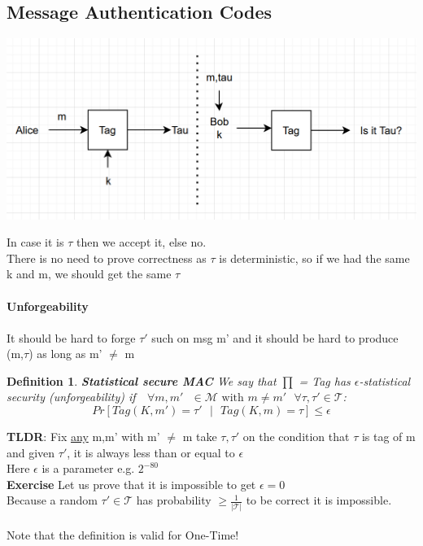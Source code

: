 \documentclass[11pt, a4paper]{article}
\newtheorem{defn}{Definition}
\begin{document}
\subsection{Message Authentication Codes}
\begin{center}
    \includegraphics[scale=0.5]{img/MAC.png}
\end{center}
In case it is $\tau$ then we accept it, else no.\\
There is no need to prove correctness as $\tau$ is deterministic, so if we had the same k and m, we should get the same $\tau$\\\\
\textbf{Unforgeability}\\\\
It should be hard to forge $\tau'$ such on msg m' and it should be hard to produce (m,$\tau$) as long as m' $\neq$ m\\
\begin{defn}
\textbf{Statistical secure MAC} We say that $\prod$ = Tag has $\epsilon$-statistical security (unforgeability) if  $\text{ }\forall m,m'\text{ } \in \mathcal{M} \text{ with } m \neq m'\text{ } \forall \tau,\tau' \in \mathcal{T}$:\\
$$Pr[Tag(K,m') = \tau'\text{ } | \text{ }Tag(K,m)= \tau] \leq \epsilon$$
\end{defn}
\textbf{TLDR}: Fix \underline{any} m,m' with m' $\neq$ m take $\tau,\tau'$ on the condition that $\tau$ is tag of m and given $\tau'$, it is always less than or equal to $\epsilon$\\
Here $\epsilon$ is a parameter e.g. $2^{-80}$\\
\textbf{Exercise} Let us prove that it is impossible to get $\epsilon = 0$\\
Because a random $\tau' \in \mathcal{T}$ has probability $\geq \frac{1}{|\mathcal{T}|}$ to be correct it is impossible.\\\\
Note that the definition is valid for One-Time!\\
\end{document}
